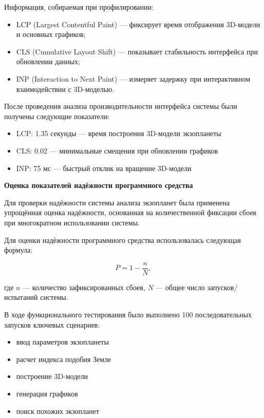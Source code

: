 Информация, собираемая при профилировании:
\begin{itemize}
    \item LCP (Largest Contentful Paint) — фиксирует время отображения 3D-модели и основных графиков;
    \item CLS (Cumulative Layout Shift) — показывает стабильность интерфейса при обновлении данных;
    \item INP (Interaction to Next Paint) — измеряет задержку при интерактивном взаимодействии с 3D-моделью.
\end{itemize}

После проведения анализа производительности интерфейса системы были получены следующие показатели:

\begin{itemize}
    \item LCP: 1.35 секунды — время построения 3D-модели экзопланеты
    \item CLS: 0.02 — минимальные смещения при обновлении графиков
    \item INP: 75 мс — быстрый отклик на вращение 3D-модели
\end{itemize}

\textbf{Оценка показателей надёжности программного средства}

Для проверки надёжности системы анализа экзопланет была применена упрощённая оценка надёжности, основанная на количественной фиксации сбоев при многократном использовании системы.

Для оценки надёжности программного средства использовалась следующая формула:

\begin{equation}
P = 1 - \frac{n}{N}, \label{eq:reliability}
\end{equation}

где $n$ — количество зафиксированных сбоев,  
$N$ — общее число запусков/испытаний системы.

В ходе функционального тестирования было выполнено 100 последовательных запусков ключевых сценариев:
\begin{itemize}
    \item ввод параметров экзопланеты
    \item расчет индекса подобия Земле
    \item построение 3D-модели
    \item генерация графиков
    \item поиск похожих экзопланет
\end{itemize}

